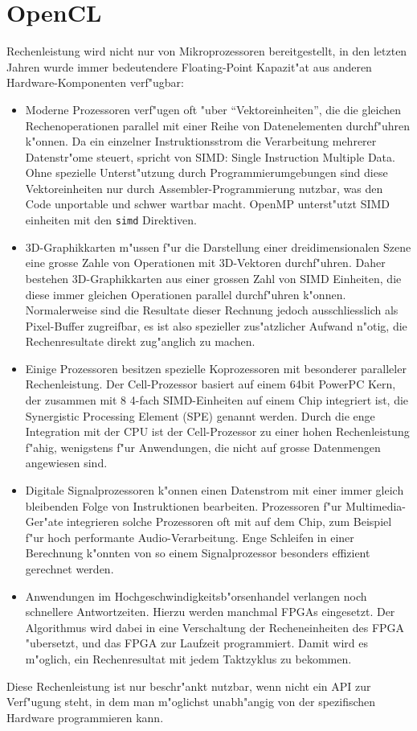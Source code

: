 \section{OpenCL\label{opencl-intro}}
Rechenleistung wird nicht nur von Mikroprozessoren bereitgestellt, in den
letzten Jahren wurde immer bedeutendere Floating-Point Kapazit"at 
aus anderen Hardware-Komponenten verf"ugbar:
\begin{itemize}
\item Moderne Prozessoren verf"ugen oft "uber ``Vektoreinheiten'', 
die die gleichen Rechenoperationen parallel mit einer Reihe von Datenelementen
durchf"uhren k"onnen.
Da ein einzelner Instruktionsstrom die Verarbeitung mehrerer Datenstr"ome
steuert, spricht von SIMD: Single Instruction Multiple Data.
Ohne spezielle Unterst"utzung durch Programmierumgebungen sind diese
Vektoreinheiten nur durch Assembler-Programmierung nutzbar, was den
Code unportable und schwer wartbar macht.
OpenMP unterst"utzt SIMD einheiten mit den {\tt simd} Direktiven.
\item 3D-Graphikkarten m"ussen f"ur die Darstellung einer dreidimensionalen
Szene eine grosse Zahle von Operationen mit 3D-Vektoren durchf"uhren. 
Daher bestehen 3D-Graphikkarten aus einer grossen Zahl von SIMD Einheiten,
die diese immer gleichen Operationen parallel durchf"uhren k"onnen. 
Normalerweise sind die Resultate dieser Rechnung jedoch ausschliesslich
als Pixel-Buffer zugreifbar, es ist also spezieller zus"atzlicher Aufwand
n"otig, die Rechenresultate direkt zug"anglich zu machen.
\item Einige Prozessoren besitzen spezielle Koprozessoren mit besonderer
paralleler Rechenleistung. Der Cell-Prozessor basiert auf einem 64bit PowerPC
Kern, der zusammen mit 8 4-fach SIMD-Einheiten auf einem Chip integriert ist, 
die Synergistic Processing Element (SPE) genannt werden.
Durch die enge Integration mit der CPU ist der Cell-Prozessor zu einer hohen
Rechenleistung f"ahig, wenigstens f"ur Anwendungen, die nicht auf grosse
Datenmengen angewiesen sind.
\item Digitale Signalprozessoren k"onnen einen Datenstrom mit einer immer
gleich bleibenden Folge von Instruktionen bearbeiten. Prozessoren
f"ur Multimedia-Ger"ate integrieren solche Prozessoren oft mit auf dem
Chip, zum Beispiel f"ur hoch performante Audio-Verarbeitung. 
Enge Schleifen in einer Berechnung k"onnten von so einem Signalprozessor 
besonders effizient gerechnet werden.
\item Anwendungen im Hochgeschwindigkeitsb"orsenhandel verlangen noch
schnellere Antwortzeiten.
Hierzu werden manchmal FPGAs eingesetzt. Der Algorithmus wird dabei
in eine Verschaltung der Recheneinheiten des FPGA "ubersetzt, und das
FPGA zur Laufzeit programmiert.
Damit wird es m"oglich, ein Rechenresultat mit jedem Taktzyklus 
zu bekommen.
\end{itemize}
Diese Rechenleistung ist nur beschr"ankt nutzbar, wenn nicht ein
API zur Verf"ugung steht, in dem man m"oglichst unabh"angig von der
spezifischen Hardware programmieren kann.

